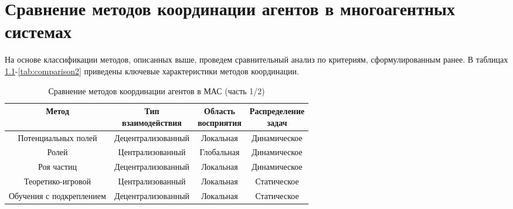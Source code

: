 \chapter{Сравнение методов координации агентов в многоагентных системах}

На основе классификации методов, описанных выше, проведем сравнительный анализ по критериям, сформулированным ранее. В таблицах \ref{tab:comparison1}-\ref{tab:comparison2} приведены ключевые характеристики методов координации.

\begin{table}[H]
	\centering
	\caption{Сравнение методов координации агентов в МАС (часть 1/2)}
	\label{tab:comparison1}
	\begin{adjustbox}{width=\textwidth}
		\begin{tabular}{|c|c|c|c|}
		\hline
		\textbf{Метод} & \makecell{\textbf{Тип}\\\textbf{взаимодействия}} & \makecell{\textbf{Область}\\\textbf{восприятия}} & \makecell{\textbf{Распределение}\\\textbf{задач}} \\ \hline
		Потенциальных полей    & Децентрализованный         & Локальная                  & Динамическое                 \\ \hline
		Ролей          & Централизованный            & Глобальная                 & Динамическое                 \\ \hline
		Роя частиц     & Децентрализованный         & Локальная                  & Динамическое                 \\ \hline
		Теоретико-игровой     & Централизованный           & Локальная                 & Статическое                  \\ \hline
		Обучения с подкреплением & Децентрализованный         & Локальная                 & Статическое                  \\ \hline
		\end{tabular}
	\end{adjustbox}
\end{table}

